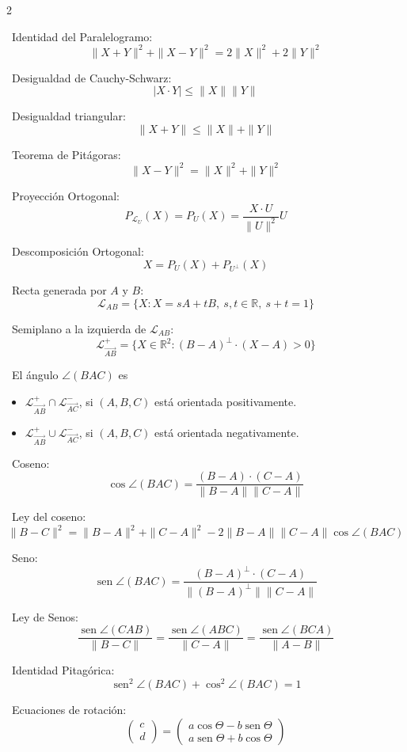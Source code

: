 \documentclass[11pt]{article}
\newcommand{\vect}[2]{\begin{pmatrix}#1\\#2\end{pmatrix}}
\begin{document}
\begin{multicols}{2}
\setlength{\columnseprule}{0.5pt}

\textbullet\ Identidad del Paralelogramo:
$$\|X+Y\|^2+\|X-Y\|^2=2\|X\|^2+2\|Y\|^2$$

\textbullet\ Desigualdad de Cauchy-Schwarz:
$$|X\cdot Y|\leq\|X\|\|Y\|$$

\textbullet\ Desigualdad triangular:
$$\|X+Y\|\leq\|X\|+\|Y\|$$

\textbullet\ Teorema de Pitágoras:
$$\|X-Y\|^2=\|X\|^2+\|Y\|^2$$

\textbullet\ Proyección Ortogonal:
$$P_{\mathcal{L}_U}(X)=P_U(X)=\dfrac{X\cdot U}{\|U\|^2}U$$

\textbullet\ Descomposición Ortogonal:
$$X=P_U(X)+P_{U^\perp}(X)$$

\textbullet\ Recta generada por $A$ y $B$:
$$\mathcal{L}_{AB}=\{X: X=sA+tB,\ s,t\in\mathbb{R},\ s+t=1\}$$

\textbullet\ Semiplano a la izquierda de $\mathcal{L}_{AB}$:
$$\mathcal{L}_{\overrightarrow{AB}}^+=\{X\in\mathbb{R}^2: (B-A)^\perp\cdot(X-A)>0\}$$

\textbullet\ El ángulo $\angle(BAC)$ es
\begin{itemize}
\item $\mathcal{L}_{\overrightarrow{AB}}^+\cap\mathcal{L}_{\overrightarrow{AC}}^-$, si $(A,B,C)$ está orientada positivamente.
\item $\mathcal{L}_{\overrightarrow{AB}}^+\cup\mathcal{L}_{\overrightarrow{AC}}^-$, si $(A,B,C)$ está orientada negativamente.
\end{itemize}

\columnbreak

\textbullet\ Coseno:
$$\cos\angle(BAC)=\dfrac{(B-A)\cdot(C-A)}{\|B-A\|\|C-A\|}$$

\textbullet\ Ley del coseno:
$$\|B-C\|^2=\|B-A\|^2+\|C-A\|^2-2\|B-A\|\|C-A\|\cos\angle(BAC)$$

\textbullet\ Seno:
$$\operatorname{sen}\angle(BAC)=\dfrac{(B-A)^\perp\cdot(C-A)}{\|(B-A)^\perp\|\|C-A\|}$$

\textbullet\ Ley de Senos:
$$\dfrac{\operatorname{sen}\angle(CAB)}{\|B-C\|}=\dfrac{\operatorname{sen}\angle(ABC)}{\|C-A\|}=\dfrac{\operatorname{sen}\angle(BCA)}{\|A-B\|}$$

\textbullet\ Identidad Pitagórica:
$$\operatorname{sen}^2\angle(BAC)+\cos^2\angle(BAC)=1$$

\textbullet\ Ecuaciones de rotación:
$$\vect{c}{d}=\begin{pmatrix}a\cos\Theta-b\operatorname{sen}\Theta\\a\operatorname{sen}\Theta+b\cos\Theta\end{pmatrix}$$


\end{multicols}
\end{document}

